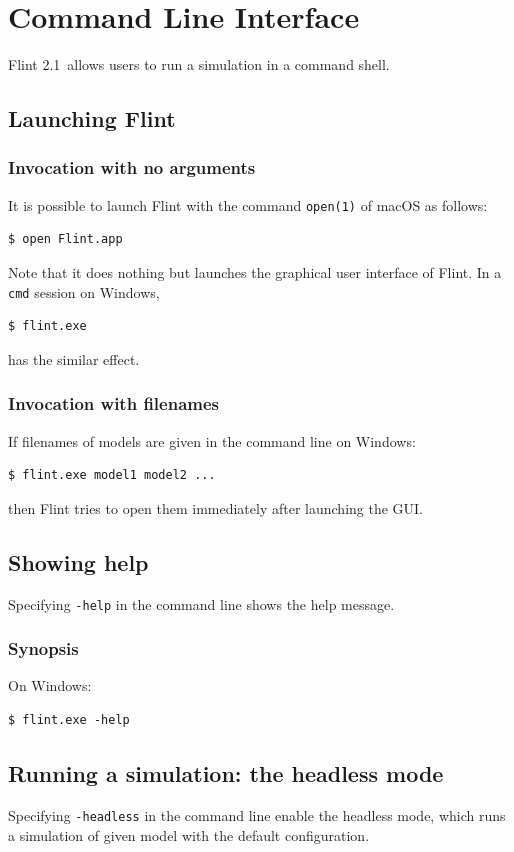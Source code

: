 \documentclass[a4paper,10pt]{report}
\def\FlintVersion{2.1}
\def\Flint{Flint \FlintVersion}
\begin{document}

\chapter{Command Line Interface}
\Flint\ allows users to run a simulation in a command shell.

\section{Launching Flint}

\subsection{Invocation with no arguments}
It is possible to launch Flint with the command {\tt open(1)} of macOS as follows:
\begin{verbatim}
$ open Flint.app
\end{verbatim}
Note that it does nothing but launches the graphical user interface of Flint.
In a {\tt cmd} session on Windows,
\begin{verbatim}
$ flint.exe
\end{verbatim}
has the similar effect.

\subsection{Invocation with filenames}
If filenames of models are given in the command line on Windows:
\begin{verbatim}
$ flint.exe model1 model2 ...
\end{verbatim}
then Flint tries to open them immediately after launching the GUI.

\section{Showing help}
Specifying {\tt -help} in the command line shows the help message.

\subsection{Synopsis}
On Windows:
\begin{verbatim}
$ flint.exe -help
\end{verbatim}

\section{Running a simulation: the headless mode}
Specifying {\tt -headless} in the command line enable the headless mode, which
runs a simulation of given model with the default configuration.
\end{document}
